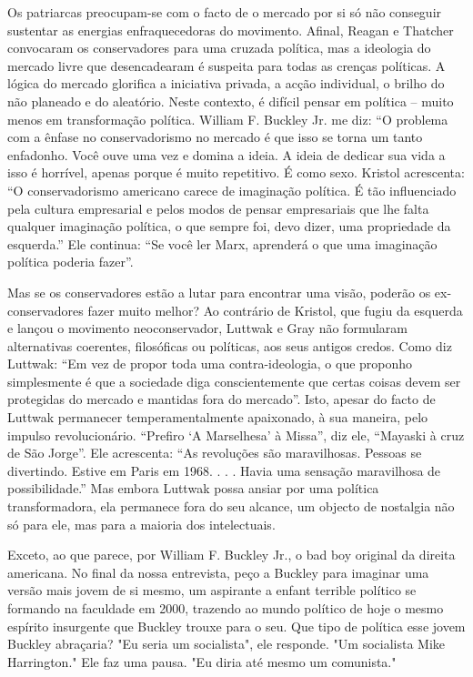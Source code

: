 Os patriarcas preocupam-se com o facto de o mercado por si só não conseguir sustentar as energias enfraquecedoras do movimento. Afinal, Reagan e Thatcher convocaram os conservadores para uma cruzada política, mas a ideologia do mercado livre que desencadearam é suspeita para todas as crenças políticas. A lógica do mercado glorifica a iniciativa privada, a acção individual, o brilho do não planeado e do aleatório. Neste contexto, é difícil pensar em política – muito menos em transformação política. William F. Buckley Jr. me diz: “O problema com a ênfase no conservadorismo no mercado é que isso se torna um tanto enfadonho. Você ouve uma vez e domina a ideia. A ideia de dedicar sua vida a isso é horrível, apenas porque é muito repetitivo. É como sexo. Kristol acrescenta: “O conservadorismo americano carece de imaginação política. É tão influenciado pela cultura empresarial e pelos modos de pensar empresariais que lhe falta qualquer imaginação política, o que sempre foi, devo dizer, uma propriedade da esquerda.” Ele continua: “Se você ler Marx, aprenderá o que uma imaginação política poderia fazer”.
 \par 
Mas se os conservadores estão a lutar para encontrar uma visão, poderão os ex-conservadores fazer muito melhor? Ao contrário de Kristol, que fugiu da esquerda e lançou o movimento neoconservador, Luttwak e Gray não formularam alternativas coerentes, filosóficas ou políticas, aos seus antigos credos. Como diz Luttwak: “Em vez de propor toda uma contra-ideologia, o que proponho simplesmente é que a sociedade diga conscientemente que certas coisas devem ser protegidas do mercado e mantidas fora do mercado”. Isto, apesar do facto de Luttwak permanecer temperamentalmente apaixonado, à sua maneira, pelo impulso revolucionário. “Prefiro ‘A Marselhesa’ à Missa”, diz ele, “Mayaski à cruz de São Jorge”. Ele acrescenta: “As revoluções são maravilhosas. Pessoas se divertindo. Estive em Paris em 1968. . . . Havia uma sensação maravilhosa de possibilidade.” Mas embora Luttwak possa ansiar por uma política transformadora, ela permanece fora do seu alcance, um objecto de nostalgia não só para ele, mas para a maioria dos intelectuais.
 \par 
Exceto, ao que parece, por William F. Buckley Jr., o bad boy original da direita americana. No final da nossa entrevista, peço a Buckley para imaginar uma versão mais jovem de si mesmo, um aspirante a enfant terrible político se formando na faculdade em 2000, trazendo ao mundo político de hoje o mesmo espírito insurgente que Buckley trouxe para o seu. Que tipo de política esse jovem Buckley abraçaria? "Eu seria um socialista", ele responde. "Um socialista Mike Harrington." Ele faz uma pausa. "Eu diria até mesmo um comunista."
